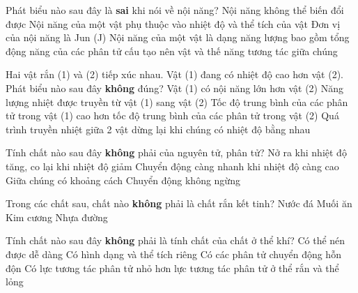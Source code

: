 \begin{ex}
Phát biểu nào sau đây là \textbf{sai} khi nói về nội năng?
\choice
{\True Nội năng không thể biến đổi được}
{Nội năng của một vật phụ thuộc vào nhiệt độ và thể tích của vật}
{Đơn vị của nội năng là Jun (J)}
{Nội năng của một vật là dạng năng lượng bao gồm tổng động năng của các phân tử cấu tạo nên vật và thế năng tương tác giữa chúng}
\end{ex}
\begin{ex}
Hai vật rắn (1) và (2) tiếp xúc nhau. Vật (1) đang có nhiệt độ cao hơn vật (2). Phát biểu nào sau đây \textbf{không} đúng?
\choice
{\True Vật (1) có nội năng lớn hơn vật (2)}
{Năng lượng nhiệt được truyền từ vật (1) sang vật (2)}
{Tốc độ trung bình của các phân tử trong vật (1) cao hơn tốc độ trung bình của các phân tử trong vật (2)}
{Quá trình truyền nhiệt giữa 2 vật dừng lại khi chúng có nhiệt độ bằng nhau}
\loigiai{}
\end{ex}
\begin{ex}
Tính chất nào sau đây \textbf{không} phải của nguyên tử, phân tử?
\choice
{\True Nở ra khi nhiệt độ tăng, co lại khi nhiệt độ giảm}
{Chuyển động càng nhanh khi nhiệt độ càng cao}
{Giữa chúng có khoảng cách}
{Chuyển động không ngừng}
\end{ex}
\begin{ex}
Trong các chất sau, chất nào \textbf{không} phải là chất rắn kết tinh?
\choice
{Nước đá}
{Muối ăn}
{Kim cương}
{\True Nhựa đường}
\end{ex}
\begin{ex}
Tính chất nào sau đây \textbf{không} phải là tính chất của chất ở thể khí?
\choice
{Có thể nén được dễ dàng}
{\True Có hình dạng và thể tích riêng}
{Có các phân tử chuyển động hỗn độn}
{Có lực tương tác phân tử nhỏ hơn lực tương tác phân tử ở thể rắn và thể lỏng}
\end{ex}
